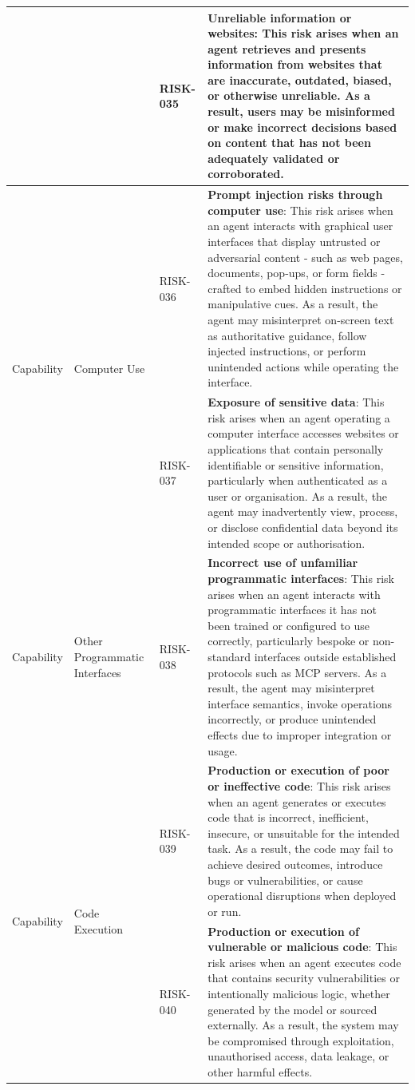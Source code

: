\documentclass{article}
\begin{document}
\begin{longtable}{|p{}|p{}|p{}|p{}|}
& & RISK-035 & \textbf{Unreliable information or websites}: This risk arises when an agent retrieves and presents information from websites that are inaccurate, outdated, biased, or otherwise unreliable. As a result, users may be misinformed or make incorrect decisions based on content that has not been adequately validated or corroborated. \\ \hline
\multirow{2}{=}{Capability}
& \multirow{2}{=}{Computer Use}
& RISK-036 & \textbf{Prompt injection risks through computer use}: This risk arises when an agent interacts with graphical user interfaces that display untrusted or adversarial content - such as web pages, documents, pop-ups, or form fields - crafted to embed hidden instructions or manipulative cues. As a result, the agent may misinterpret on-screen text as authoritative guidance, follow injected instructions, or perform unintended actions while operating the interface. \\ \cline{3-4}
& & RISK-037 & \textbf{Exposure of sensitive data}: This risk arises when an agent operating a computer interface accesses websites or applications that contain personally identifiable or sensitive information, particularly when authenticated as a user or organisation. As a result, the agent may inadvertently view, process, or disclose confidential data beyond its intended scope or authorisation. \\ \hline
\multirow{1}{=}{Capability}
& \multirow{1}{=}{Other Programmatic Interfaces}
& RISK-038 & \textbf{Incorrect use of unfamiliar programmatic interfaces}: This risk arises when an agent interacts with programmatic interfaces it has not been trained or configured to use correctly, particularly bespoke or non-standard interfaces outside established protocols such as MCP servers. As a result, the agent may misinterpret interface semantics, invoke operations incorrectly, or produce unintended effects due to improper integration or usage. \\ \hline
\multirow{2}{=}{Capability}
& \multirow{2}{=}{Code Execution}
& RISK-039 & \textbf{Production or execution of poor or ineffective code}: This risk arises when an agent generates or executes code that is incorrect, inefficient, insecure, or unsuitable for the intended task. As a result, the code may fail to achieve desired outcomes, introduce bugs or vulnerabilities, or cause operational disruptions when deployed or run. \\ \cline{3-4}
& & RISK-040 & \textbf{Production or execution of vulnerable or malicious code}: This risk arises when an agent executes code that contains security vulnerabilities or intentionally malicious logic, whether generated by the model or sourced externally. As a result, the system may be compromised through exploitation, unauthorised access, data leakage, or other harmful effects. \\ \hline

\end{longtable}
\end{document}
